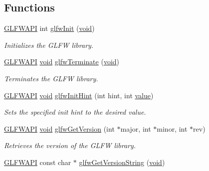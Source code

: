 \subsection*{Functions}
\begin{DoxyCompactItemize}
\item 
\mbox{\hyperlink{glfw3_8h_a56da5036b2cc259351ae22fd6439bb47}{G\+L\+F\+W\+A\+PI}} int \mbox{\hyperlink{group__init_gab41771f0215a2e0afb4cf1cf98082d40}{glfw\+Init}} (\mbox{\hyperlink{glad_8h_a950fc91edb4504f62f1c577bf4727c29}{void}})
\begin{DoxyCompactList}\small\item\em Initializes the G\+L\+FW library. \end{DoxyCompactList}\item 
\mbox{\hyperlink{glfw3_8h_a56da5036b2cc259351ae22fd6439bb47}{G\+L\+F\+W\+A\+PI}} \mbox{\hyperlink{glad_8h_a950fc91edb4504f62f1c577bf4727c29}{void}} \mbox{\hyperlink{group__init_gafd90e6fd4819ea9e22e5e739519a6504}{glfw\+Terminate}} (\mbox{\hyperlink{glad_8h_a950fc91edb4504f62f1c577bf4727c29}{void}})
\begin{DoxyCompactList}\small\item\em Terminates the G\+L\+FW library. \end{DoxyCompactList}\item 
\mbox{\hyperlink{glfw3_8h_a56da5036b2cc259351ae22fd6439bb47}{G\+L\+F\+W\+A\+PI}} \mbox{\hyperlink{glad_8h_a950fc91edb4504f62f1c577bf4727c29}{void}} \mbox{\hyperlink{group__init_gac85e41aab1c2bd6fc740f4377d9e7e9f}{glfw\+Init\+Hint}} (int hint, int \mbox{\hyperlink{glad_8h_a03aff08f73d7fde3d1a08e0abd8e84fa}{value}})
\begin{DoxyCompactList}\small\item\em Sets the specified init hint to the desired value. \end{DoxyCompactList}\item 
\mbox{\hyperlink{glfw3_8h_a56da5036b2cc259351ae22fd6439bb47}{G\+L\+F\+W\+A\+PI}} \mbox{\hyperlink{glad_8h_a950fc91edb4504f62f1c577bf4727c29}{void}} \mbox{\hyperlink{group__init_ga2402c7824ac0194c13722790ff9559ff}{glfw\+Get\+Version}} (int $\ast$major, int $\ast$minor, int $\ast$rev)
\begin{DoxyCompactList}\small\item\em Retrieves the version of the G\+L\+FW library. \end{DoxyCompactList}\item 
\mbox{\hyperlink{glfw3_8h_a56da5036b2cc259351ae22fd6439bb47}{G\+L\+F\+W\+A\+PI}} const char $\ast$ \mbox{\hyperlink{group__init_ga4b9092ac5eace57d94d3cd551d6b8ded}{glfw\+Get\+Version\+String}} (\mbox{\hyperlink{glad_8h_a950fc91edb4504f62f1c577bf4727c29}{void}})

\end{DoxyCompactItemize}
